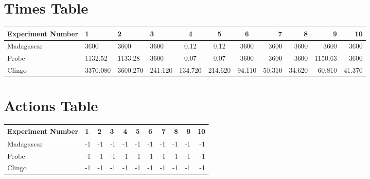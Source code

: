 \documentclass[8pt]{article}
\begin{document}
\begin{landscape}
\section{Times Table}\begin{tabular}{ | l | l | l | l | c | c | c | r | r | r | r | }\hline
Experiment Number & 1 & 2 & 3 & 4 & 5 & 6 & 7 & 8 & 9 & 10\\  \hline
Madagascar & 3600 & 3600 & 3600 & 0.12 & 0.12 & 3600 & 3600 & 3600 & 3600 & 3600\\  \hline
Probe & 1132.52 & 1133.28 & 3600 & 0.07 & 0.07 & 3600 & 3600 & 3600 & 1150.63 & 3600\\  \hline
Clingo & 3370.080 & 3600.270 & 241.120 & 134.720 & 214.620 & 94.110 & 50.310 & 34.620 & 60.810 & 41.370\\ \hline
\end{tabular}
\section{Actions Table}\begin{tabular}{ | l | l | l | l | c | c | c | r | r | r | r | }\hline
Experiment Number & 1 & 2 & 3 & 4 & 5 & 6 & 7 & 8 & 9 & 10\\ \hline
 Madagascar & -1 & -1 & -1 & -1 & -1 & -1 & -1 & -1 & -1 & -1\\ \hline
 Probe & -1 & -1 & -1 & -1 & -1 & -1 & -1 & -1 & -1 & -1\\ \hline
 Clingo & -1 & -1 & -1 & -1 & -1 & -1 & -1 & -1 & -1 & -1\\ \hline
\end{tabular}
\end{landscape}
\end{document}
